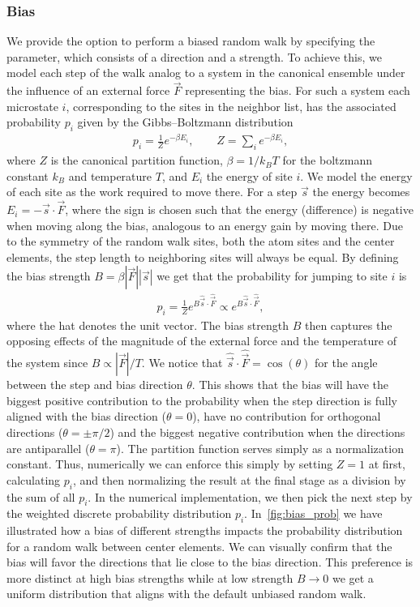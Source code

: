 \subsubsection{Bias} %
We provide the option to perform a biased random walk by specifying the
 parameter, which consists of a direction and a strength. To achieve
this, we model each step of the walk analog to a system in the canonical
ensemble under the influence of an external force $\vec{F}$ representing the
bias. For such a system each microstate $i$, corresponding to the sites in the
neighbor list, has the associated probability $p_i$ given by the Gibbs–Boltzmann
distribution
\begin{align*}
  p_{i} = \frac{1}{Z}e^{-\beta E_i}, \qquad Z = \sum_i e^{-\beta E_i},
\end{align*}
where $Z$ is the canonical partition function, $\beta = 1/k_B T$ for the
boltzmann constant $k_B$ and temperature $T$, and $E_i$ the energy of site $i$.
We model the energy of each site as the work required to move there. For a step
$\vec{s}$ the energy becomes $E_i = -\vec{s}\cdot\vec{F}$, where the sign is chosen such that the energy (difference) is negative when moving along the bias, analogous to an energy gain by
moving there. Due to the symmetry of the random walk sites, both the atom sites and the center elements, the step length to neighboring sites will always be equal. By defining
the bias strength $B = \beta|\vec{F}||\vec{s}|$ we get that the probability for
jumping to site $i$ is
\begin{align*}
  p_i = \frac{1}{Z}e^{B\hat{\vec{s}}\cdot\hat{\vec{F}}} \propto e^{B\hat{\vec{s}}\cdot\hat{\vec{F}}},
\end{align*}
 where the hat denotes the unit vector. The bias strength $B$ then captures the opposing effects of the magnitude of the external force and the
 temperature of the system since $B\propto |\vec{F}|/T$. We notice that
 $\hat{\vec{s}}\cdot\hat{\vec{F}} = \cos{(\theta)}$ for the angle
 between the step and bias direction $\theta$. This shows that the bias will have the
 biggest positive contribution to the probability when the step direction is fully aligned with the bias
 direction ($\theta = 0$), have no contribution for orthogonal directions
 ($\theta = \pm \pi/2$) and the biggest negative contribution when the directions
 are antiparallel ($\theta = \pi$). The partition function serves simply as a
 normalization constant. Thus, numerically we can enforce this simply by setting $Z = 1$ at first, calculating $p_i$, and then normalizing the result at the final stage as a
 division by the sum of all $p_i$. In the numerical implementation, we then pick
 the next step by the weighted discrete probability distribution $p_i$. In~\cref{fig:bias_prob} we have illustrated how a bias of different strengths impacts the probability distribution for a random walk between center elements. We can visually confirm that the bias will favor the directions that lie close to the bias direction. This preference is more distinct at high bias strengths while at low strength $B\to0$ we get a uniform distribution that aligns with the default unbiased random walk. 

